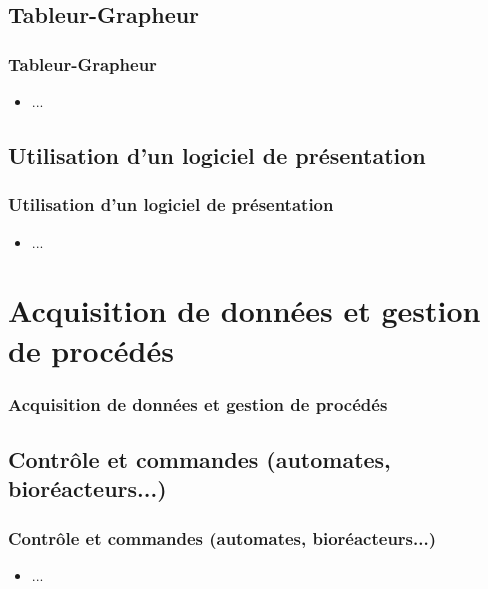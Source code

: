\documentclass{beamer}
\begin{document}
\def\titleSection2Subsection3{Tableur-Grapheur}
\subsection{ \titleSection2Subsection3 }
\begin{frame}
	\frametitle{ \titleSection2Subsection3 }
	\begin{itemize}
		\item ... 
	\end{itemize}
\end{frame}

\def\titleSection2Subsection4{Utilisation d'un logiciel de pr{\'e}sentation}
\subsection{ \titleSection2Subsection4 }
\begin{frame}
	\frametitle{ \titleSection2Subsection4 }
	\begin{itemize}
		\item ... 
	\end{itemize}
\end{frame}


\def\titleSection3{Acquisition de donn{\'e}es et gestion de proc{\'e}d{\'e}s}
\section{ \titleSection3 }
\begin{frame}
	\frametitle{ \titleSection3 }
	\tableofcontents[sections=4,currentsection,subsectionstyle=show/shaded/hide]
\end{frame} 

\def\titleSection3SubsectionI{Contr{\^o}le et commandes (automates, bior{\'e}acteurs...)}
\subsection{ \titleSection3SubsectionI }
\begin{frame}
	\frametitle{ \titleSection3SubsectionI }
	\begin{itemize}
		\item ... 
	\end{itemize}
\end{frame}

\def\titleSection3Subsection2ACRO{TAI}
\def\titleSection3Subsection2{Traitements et Analyses d'Images (TAI)}
\end{document}
